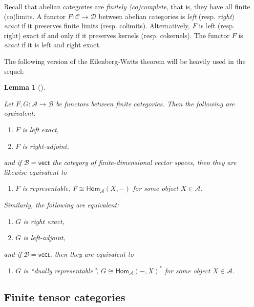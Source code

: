 \documentclass[11pt]{article}
\newtheorem{lemma}[theorem]{Lemma}
\theoremstyle{definition}
\begin{document}
Recall that abelian categories are \emph{finitely (co)complete}, that is, they have all finite (co)limits. A functor $F: \mathcal{C} \to \mathcal{D}$ between abelian categories is \emph{left} (resp. \emph{right}) \emph{exact} if it preserves finite limits (resp. colimits).  Alternatively, $F$ is left (resp. right) exact if and only if it preserves kernels (resp. cokernels). The functor $F$ is \emph{exact} if it is left and right exact.

The following version of the Eilenberg-Watts theorem will be heavily used in the sequel:

\begin{lemma}[{\cite[Corollary 2.3]{fss}}]\label{lem:left_exact=right_adjoint}

Let $F,G: \mathcal{A} \to \mathcal{B}$ be functors between finite categories. Then the following are equivalent:
\begin{enumerate}\itemsep0em 
\item[(L1)] $F$ is left exact,
\item[(L2)] $F$ is right-adjoint,
\end{enumerate}
and if $\mathcal{B} = \mathsf{vect}$ the category of finite-dimensional vector spaces, then they are likewise equivalent to
\begin{enumerate}
\item[(L3)] $F$ is representable, $F \cong \mathsf{Hom}_{\mathcal{A}}(X,-)$ for some object $X \in \mathcal{A}$.
\end{enumerate}
Similarly, the following are equivalent:
\begin{enumerate}\itemsep0em 
\item[(R1)] $G$ is right exact,
\item[(R2)] $G$ is left-adjoint,
\end{enumerate}
and if $\mathcal{B} = \mathsf{vect}$, then they are equivalent to
\begin{enumerate}
\item[(R3)] $G$ is ``dually representable'', $G \cong \mathsf{Hom}_{\mathcal{A}}(-,X)^*$ for some object $X \in \mathcal{A}$.
\end{enumerate}
\end{lemma}


\subsection{Finite tensor categories}
\end{document}
